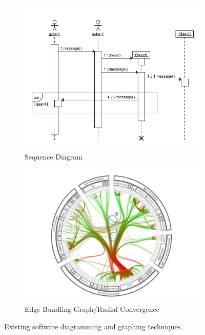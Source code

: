 \begin{figure}
\begin{subfigure}{.5\textwidth}
  \includegraphics[width=.95\linewidth]{../images/code-visualisations/sequence-diagram.png}
  \caption{Sequence Diagram}
  \label{fig:sequence-diagram}
\end{subfigure}%
\begin{subfigure}{.5\textwidth}
  \includegraphics[width=.95\linewidth]{../images/code-visualisations/bundle-graph.jpg}
  \caption{Edge Bundling Graph/Radial Convergence}
  \label{fig:bundle-graph}
\end{subfigure}

\caption[Existing software diagramming and graphing techniques]{Existing software diagramming and graphing techniques.}
\label{fig:code-diagrams}
\end{figure}